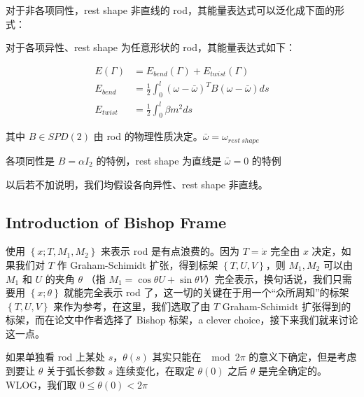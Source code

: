 \documentclass{notes}
\begin{document}
对于非各项同性，rest shape 非直线的 rod，其能量表达式可以泛化成下面的形式：

\begin{definition}
	对于各项异性、rest shape 为任意形状的 rod，其能量表达式如下：

	\begin{equation}
		\begin{aligned}
			E(\Gamma) &= E_{bend}(\Gamma) + E_{twist}(\Gamma) \\
			E_{bend} &= \frac{1}{2} \int_{0}^{l} (\omega - \bar{\omega})^T B (\omega - \bar{\omega}) ds \\
			E_{twist} &= \frac{1}{2} \int_{0}^{l} \beta m^2 ds
		\end{aligned}
	\end{equation}

	其中 $B \in SPD(2)$ 由 rod 的物理性质决定。$\bar{\omega} = \omega_{rest\ shape}$ 
\end{definition}

\begin{remark}
	各项同性是 $B = \alpha I_2$ 的特例，rest shape 为直线是 $\bar{\omega} = 0$ 的特例
\end{remark}

以后若不加说明，我们均假设各向异性、rest shape 非直线。

\subsection{Introduction of Bishop Frame}

使用 $\left\lbrace x; T, M_1, M_2 \right\rbrace$ 来表示 rod 是有点浪费的。因为 $T = \dot{x}$ 完全由 $x$ 决定，如果我们对 $T$ 作 Graham-Schimidt 扩张，得到标架 $\left\lbrace T, U, V \right\rbrace$，则 $M_1, M_2$ 可以由 $M_1$ 和 $U$ 的夹角 $\theta$ （指 $M_1 = \cos \theta U + \sin \theta V$）完全表示，换句话说，我们只需要用 $\left\lbrace x; \theta \right\rbrace$ 就能完全表示 rod 了，这一切的关键在于用一个“众所周知”的标架 $\left\lbrace T, U, V \right\rbrace$ 来作为参考，在这里，我们选取了由 $T$ Graham-Schimidt 扩张得到的标架，而在论文中作者选择了 Bishop 标架，a clever choice，接下来我们就来讨论这一点。

\begin{remark}
	如果单独看 rod 上某处 $s$，$\theta(s)$ 其实只能在 $\mod 2 \pi$ 的意义下确定，但是考虑到要让 $\theta$ 关于弧长参数 $s$ 连续变化，在取定 $\theta(0)$ 之后 $\theta$ 是完全确定的。WLOG，我们取 $0 \le \theta(0) \lt 2 \pi$
\end{remark}
\end{document}
